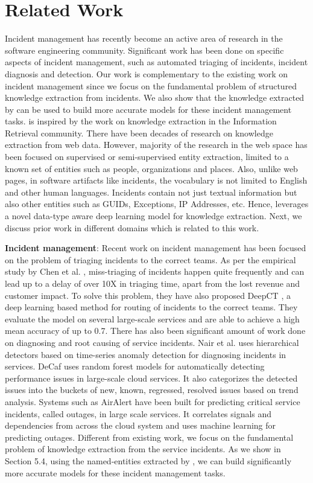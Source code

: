 \section{Related Work}
Incident management has recently become an active area of research in the software engineering community. Significant work has been done on specific aspects of incident management, such as automated triaging of incidents, incident diagnosis and detection. Our work is complementary to the existing work on incident management since we focus on the fundamental problem of structured knowledge extraction from incidents. We also show that the knowledge extracted by \softner{} can be used to build more accurate models for these incident management tasks. \softner{} is inspired by the work on knowledge extraction in the Information Retrieval community. There have been decades of research on knowledge extraction from web data. However, majority of the research in the web space has been focused on supervised or semi-supervised entity extraction, limited to a known set of entities such as people, organizations and places. Also, unlike web pages, in software artifacts like incidents, the vocabulary is not limited to English and other human languages. Incidents contain not just textual information but also other entities such as GUIDs, Exceptions, IP Addresses, etc. Hence, \softner{} leverages a novel data-type aware deep learning model for knowledge extraction. Next, we discuss prior work in different domains which is related to this work.

\textbf{Incident management}: Recent work on incident management has been focused on the problem of triaging incidents to the correct teams. As per the empirical study by Chen et al. \cite{EmpiricalIcMICSE2019}, miss-triaging of incidents happen quite frequently and can lead up to a delay of over 10X in triaging time, apart from the lost revenue and customer impact. To solve this problem, they have also proposed DeepCT \cite{ContinuousTriageASE2019}, a deep learning based method for routing of incidents to the correct teams. They evaluate the model on several large-scale services and are able to achieve a high mean accuracy of up to 0.7. There has also been significant amount of work done on diagnosing and root causing of service incidents. Nair et al. \cite{nair2015learning} uses hierarchical detectors based on time-series anomaly detection for diagnosing incidents in services. DeCaf \cite{bansal2019decaf} uses random forest models for automatically detecting performance issues in large-scale cloud services. It also categorizes the detected issues into the buckets of new, known, regressed, resolved issues based on trend analysis. Systems such as AirAlert \cite{chen2019outage} have been built for predicting critical service incidents, called outages, in large scale services. It correlates signals and dependencies from across the cloud system and uses machine learning for predicting outages. Different from existing work, we focus on the fundamental problem of knowledge extraction from the service incidents. As we show in Section 5.4, using the named-entities extracted by \softner{}, we can build significantly more accurate models for these incident management tasks.

